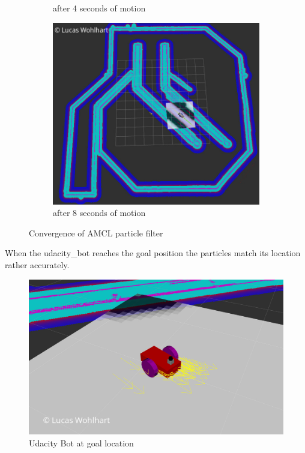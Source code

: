 \documentclass[10pt,journal,compsoc]{IEEEtran}
\begin{document}
\begin{figure}[ht]
\begin{subfigure}[b]{0.36\textwidth}
          \caption{after 4 seconds of motion}
          \label{fig:particles_}
      \end{subfigure}
      \begin{subfigure}[b]{0.36\textwidth}
          \includegraphics[width=\textwidth]{img/particles_initial_high_cov_8sec}
          \caption{after 8 seconds of motion}
          \label{fig:particles_}
      \end{subfigure}
      \caption{Convergence of AMCL particle filter}
      \label{fig:particle_filter_converging}
  \end{figure}


  When the udacity\_bot reaches the goal position the particles match its location rather accurately.

  \begin{figure}[thpb]
      \centering
      \includegraphics[width=\linewidth]{img/udacity_bot_goal_location}
      \caption{Udacity Bot at goal location}
      \label{fig:udacity_bot_goal_location}
\end{figure}
\end{document}
